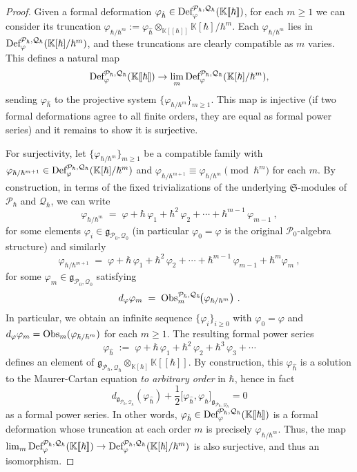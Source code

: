 \documentclass[11pt]{amsart}
\numberwithin{equation}{section}
\theoremstyle{definition}
\newcommand{\bb}{\mathbb}
\newcommand{\mc}{\mathcal}
\newcommand{\mf}{\mathfrak}
\newcommand{\Def}{{\textup{Def}}}
\newcommand{\Ph}{{\mathcal{P}_\hbar}}
\newcommand{\Qh}{{\mathcal{Q}_\hbar}}
\newcommand{\fph}{{[\![\hbar]\!]}}
\newcommand{\K}{{\bb K}}
\newcommand{\Obs}{{\textup{Obs}}}
\newcommand{\Ss}{{{\mf{S}}}}
\newcommand{\0}{{\textbf{0}}}
\newcommand{\g}{{\mf{g}}}
\def \mf{\mathfrak}
\begin{document}
\begin{proof}
Given a formal deformation $\varphi_{\hat{\hbar}} \in \Def^{\Ph,\Qh}_\varphi(\K\fph)$, for each $m\ge 1$ we can consider its truncation $\varphi_{\hbar/\hbar^m}:=\varphi_{\hat{\hbar}} \otimes_{\K\fph} \K[\hbar]/\hbar^m$. Each $\varphi_{\hbar/\hbar^m}$ lies in $\Def^{\Ph,\Qh}_\varphi(\K[\hbar]/\hbar^m)$, and these truncations are clearly compatible as $m$ varies. This defines a natural map 
\[ \Def^{\Ph,\Qh}_\varphi(\K\fph)\to \lim_{m}\Def^{\Ph,\Qh}_\varphi(\K[\hbar]/\hbar^m) ,\] 
sending $\varphi_{\hat{\hbar}}$ to the projective system $\{\varphi_{\hbar/\hbar^m}\}_{m\ge1}$. This map is injective (if two formal deformations agree to all finite orders, they are equal as formal power series) and it remains to show it is surjective.

For surjectivity, let $\{\varphi_{\hbar/\hbar^m}\}_{m\ge1}$ be a compatible family with $\varphi_{\hbar/\hbar^{m+1}}\in \Def^{\Ph,\Qh}_\varphi(\K[\hbar]/\hbar^m)$ and $\varphi_{\hbar/\hbar^{m+1}}\equiv \varphi_{\hbar/\hbar^{m}} \pmod{\hbar^{m}}$ for each $m$. By construction, in terms of the fixed trivializations of the underlying $\Ss$-modules of $\Ph$ and $\Qh$, we can write 
\[ \varphi_{\hbar/\hbar^m} \;=\; \varphi + \hbar\,\varphi_1 + \hbar^2\,\varphi_2 + \cdots + \hbar^{m-1}\,\varphi_{m-1} \ ,\] 
for some elements $\varphi_i\in \g_{\mc P_0,\mc Q_0}$ (in particular $\varphi_0=\varphi$ is the original $\mc P_0$-algebra structure) and similarly
\[ \varphi_{\hbar/\hbar^{m+1}} \;=\; \varphi + \hbar\,\varphi_1 + \hbar^2\,\varphi_2 + \cdots + \hbar^{m-1}\,\varphi_{m-1}+\hbar^m\varphi_m \ ,\] 
for some $\varphi_m\in \g_{\mc P_0,\mc Q_0}$ satisfying
\[ d_\varphi \varphi_m \;=\; \Obs_m^{\Ph,\Qh}\!\big(\varphi_{\hbar/\hbar^m}\big) \ . \] 
In particular, we obtain an infinite sequence $\{\varphi_i\}_{i\geq 0}$ with $\varphi_0=\varphi$ and $d_\varphi \varphi_m = \Obs_m(\varphi_{\hbar/\hbar^m})$ for each $m\geq 1$. The resulting formal power series 
\[ \varphi_{\hat{\hbar}} \;:=\; \varphi + \hbar\,\varphi_1 + \hbar^2\,\varphi_2 + \hbar^3\,\varphi_3 + \cdots  \] 
defines an element of $\g_{\Ph,\Qh}\otimes_{\K[\hbar]}\K\fph$. By construction, this $\varphi_{\hat{\hbar}}$ is a solution to the Maurer-Cartan equation \emph{to arbitrary order} in $\hbar$, hence in fact 
\[ d_{\g_{\Ph,\Qh}}(\varphi_{\hat{\hbar}}) + \frac{1}{2}\big[\varphi_{\hat{\hbar}},\varphi_{\hat{\hbar}}\big]_{\g_{\Ph,\Qh}} = 0 \] 
as a formal power series. In other words, $\varphi_{\hat{\hbar}}\in \Def^{\Ph,\Qh}_\varphi(\K\fph)$ is a formal deformation whose truncation at each order $m$ is precisely $\varphi_{\hbar/\hbar^m}$. Thus, the map $\lim_m \Def^{\Ph,\Qh}_\varphi(\K\fph) \to \Def^{\Ph,\Qh}_\varphi(\K[\hbar]/\hbar^m)$ is also surjective, and thus an isomorphism.


\end{proof}
\end{document}
